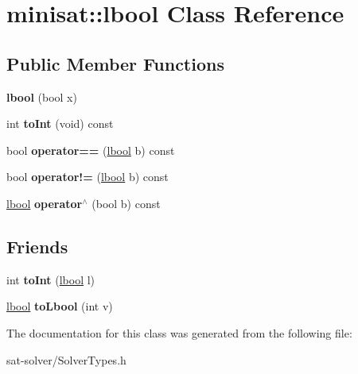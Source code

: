 \hypertarget{classminisat_1_1lbool}{\section{minisat\-:\-:lbool \-Class \-Reference}
\label{classminisat_1_1lbool}
}
\subsection*{\-Public \-Member \-Functions}
\begin{DoxyCompactItemize}
\item 
\hypertarget{classminisat_1_1lbool_aa5c3b37484a98cf4b1d5fb14dcd59ebd}{{\bfseries lbool} (bool x)}\label{classminisat_1_1lbool_aa5c3b37484a98cf4b1d5fb14dcd59ebd}

\item 
\hypertarget{classminisat_1_1lbool_ac611024879b88b3e9925b6e6deed385c}{int {\bfseries to\-Int} (void) const }\label{classminisat_1_1lbool_ac611024879b88b3e9925b6e6deed385c}

\item 
\hypertarget{classminisat_1_1lbool_a8b311b5023261cff154a1aec360a3447}{bool {\bfseries operator==} (\hyperlink{classminisat_1_1lbool}{lbool} b) const }\label{classminisat_1_1lbool_a8b311b5023261cff154a1aec360a3447}

\item 
\hypertarget{classminisat_1_1lbool_ad5d0fca2b632dc3f87795dd96a6824ad}{bool {\bfseries operator!=} (\hyperlink{classminisat_1_1lbool}{lbool} b) const }\label{classminisat_1_1lbool_ad5d0fca2b632dc3f87795dd96a6824ad}

\item 
\hypertarget{classminisat_1_1lbool_aaaa113fbda0516ebb9eee61ea0c8456b}{\hyperlink{classminisat_1_1lbool}{lbool} {\bfseries operator$^\wedge$} (bool b) const }\label{classminisat_1_1lbool_aaaa113fbda0516ebb9eee61ea0c8456b}

\end{DoxyCompactItemize}
\subsection*{\-Friends}
\begin{DoxyCompactItemize}
\item 
\hypertarget{classminisat_1_1lbool_a5515cdd2062167de7cc7d58925022893}{int {\bfseries to\-Int} (\hyperlink{classminisat_1_1lbool}{lbool} l)}\label{classminisat_1_1lbool_a5515cdd2062167de7cc7d58925022893}

\item 
\hypertarget{classminisat_1_1lbool_aa12c81454d0d55212d8f4d5937c0b664}{\hyperlink{classminisat_1_1lbool}{lbool} {\bfseries to\-Lbool} (int v)}\label{classminisat_1_1lbool_aa12c81454d0d55212d8f4d5937c0b664}

\end{DoxyCompactItemize}


\-The documentation for this class was generated from the following file\-:\begin{DoxyCompactItemize}
\item 
sat-\/solver/\-Solver\-Types.\-h\end{DoxyCompactItemize}
